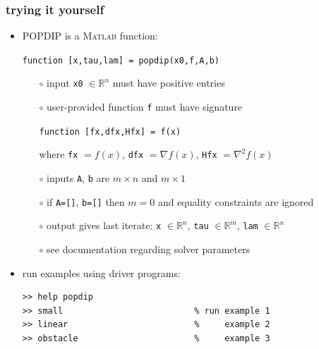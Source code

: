 \documentclass[10pt,hyperref,dvipsnames]{beamer}
\newcommand{\grad}{\nabla}
\newcommand{\RR}{\mathbb{R}}
\newcommand{\Matlab}{\textsc{Matlab}\xspace}
\begin{document}
\begin{frame}[fragile]
\frametitle{trying it yourself}

\begin{itemize}
\item POPDIP is a \Matlab function:

\medskip
\centerline{\texttt{function [x,tau,lam] = popdip(x0,f,A,b)}}

\medskip
    \begin{itemize}
    \item[$\circ$] input \texttt{x0} $\in\RR^n$ must have positive entries
    \item[$\circ$] user-provided function \texttt{f} must have signature

\medskip
\centerline{\texttt{function [fx,dfx,Hfx] = f(x)}}

\medskip
    where \texttt{fx} $=f(x)$, \texttt{dfx} $=\grad f(x)$, \texttt{Hfx} $= \grad^2 f(x)$
    \item[$\circ$] inputs \texttt{A}, \texttt{b} are $m\times n$ and $m\times 1$
    \item[$\circ$] if \texttt{A=[]}, \texttt{b=[]} then $m=0$ and equality constraints are ignored
    \item[$\circ$] output gives last iterate: \texttt{x} $\in\RR^n$, \texttt{tau} $\in\RR^m$, \texttt{lam} $\in\RR^n$
    \item[$\circ$] see documentation regarding solver parameters
    \end{itemize}

\item run examples using driver programs:
\begin{Verbatim}[fontsize=\small]
>> help popdip
>> small                          % run example 1
>> linear                         %     example 2
>> obstacle                       %     example 3
\end{Verbatim}
\end{itemize}
\end{frame}
\end{document}
